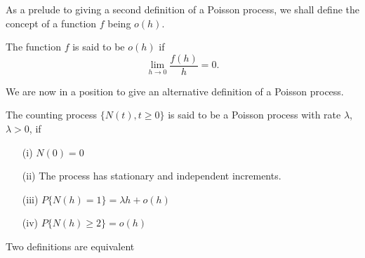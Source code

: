 \documentclass[lang=cn,10pt]{elegantbook}
\begin{document}
As a prelude to giving a second definition of a Poisson process, we shall define the concept of a function \(f\) being \(o(h)\).
\begin{definition}
	The function \(f\) is said to be \(o(h)\) if
\[
\lim_{h \to 0} \frac{f(h)}{h} = 0.
\]
\end{definition}

We are now in a position to give an alternative definition of a Poisson process.

\begin{definition}
	The counting process $\{N(t), t \geq 0\}$ is said to be a Poisson process with rate $\lambda$, $\lambda > 0$, if
\begin{itemize}
    \item[(i)] $N(0) = 0$
    \item[(ii)] The process has stationary and independent increments.
    \item[(iii)] $P\{N(h) = 1\} = \lambda h + o(h)$
    \item[(iv)] $P\{N(h) \geq 2\} = o(h)$
\end{itemize}
\end{definition}
\begin{theorem}
	Two definitions are equivalent
\end{theorem}
\end{document}
